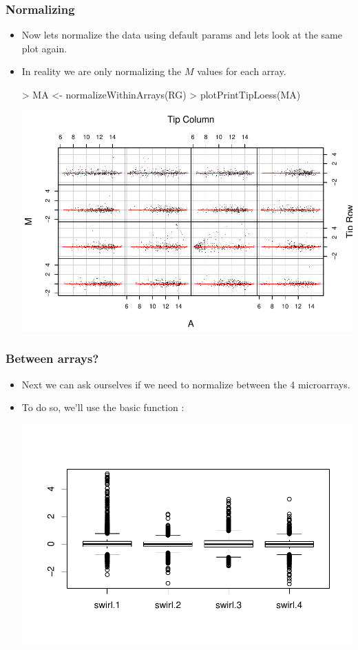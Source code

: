 \begin{frame}
  \frametitle{Normalizing}
  \begin{itemize}
  \item Now lets normalize the data using default params and lets look at the same plot again.
  \item In reality we are only normalizing the $M$ values for each array.
\begin{Schunk}
\begin{Sinput}
> MA <- normalizeWithinArrays(RG)
> plotPrintTipLoess(MA)
\end{Sinput}
\end{Schunk}
\includegraphics{plots/fig-025}
  \end{itemize}
\end{frame}

\begin{frame}
  \frametitle{Between arrays?}
  \begin{itemize}
  \item Next we can ask ourselves if we need to normalize between the 4 microarrays.
  \item To do so, we'll use the basic  function :
\begin{Schunk}
\end{Schunk}
\includegraphics{plots/fig-026}
  \end{itemize}
\end{frame}

